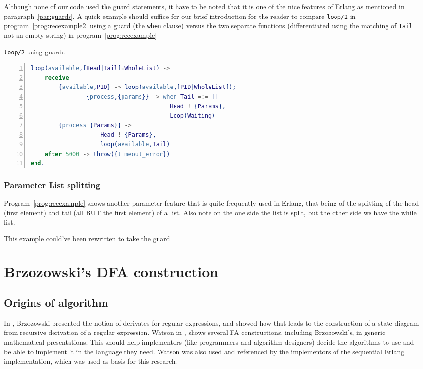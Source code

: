 \documentclass[a4paper,11pt]{report}
\begin{document}
Although none of our code used the guard statements, it have to be
noted that it is one of the nice features of Erlang as mentioned in
paragraph~\autoref{par:guards}. A quick example should suffice for our
brief introduction for the reader to compare \texttt{loop/2} in
program~\autoref{prog:recexample2} using a guard (the \texttt{when}
clause) versus the two separate functions (differentiated using the
matching of \texttt{Tail} not an empty string) in
program~\autoref{prog:recexample}
\begin{Program}[tbh]
\caption{\texttt{loop/2} using guards}
\label{prog:recexample2}
\begin{lstlisting}[language=erlang,numbers=left,numberstyle=\tiny]
loop(available,[Head|Tail]=WholeList) ->
	receive
		{available,PID} -> loop(available,[PID|WholeList]);
                {process,{params}} -> when Tail =:= []
                                        Head ! {Params},
                                        Loop(Waiting)
		{process,{Params}} ->
					Head ! {Params},
					loop(available,Tail)
	after 5000 -> throw({timeout_error})
end.
\end{lstlisting}
\end{Program}


\subsection{Parameter List splitting}
\label{sec:listsplit}

Program~\autoref{prog:recexample} shows another parameter feature that is
quite frequently used in Erlang, that being of the splitting of the
head (first element) and tail (all BUT the first element) of a
list. Also note on the one side the list is split, but the other side
we have the while list.

This example could've been rewritten to take the guard 

\chapter{Brzozowski's DFA construction}
\label{cha:brzoz-dfa-constr}

\section{Origins of algorithm}
\label{sec:origins-algorithm}


In \cite{brzozowski1964derivatives}, Brzozowski presented the notion
of derivates for regular expressions, and showed how that leads to the
construction of a state diagram from recursive derivation of a regular
expression.  Watson in \cite{watson1995taxonomies}, shows several FA
constructions, including Brzozowski's, in generic mathematical
presentations. This should help implementors (like programmers and
algorithm designers) decide the algorithms to use and be able to
implement it in the language they need. Watson was also used and
referenced by the implementors of the sequential Erlang
implementation, which was used as basis for this research.
\end{document}

